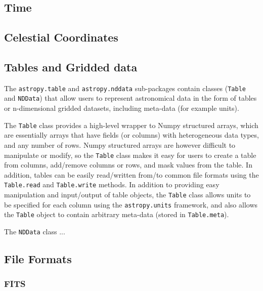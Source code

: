 \documentclass[12pt,preprint]{aastex}
\begin{document}


\subsection{Time}



\subsection{Celestial Coordinates}



\subsection{Tables and Gridded data}


The \texttt{astropy.table} and \texttt{astropy.nddata} sub-packages contain
classes (\texttt{Table} and \texttt{NDData}) that allow users to represent
astronomical data in the form of tables or n-dimensional gridded datasets,
including meta-data (for example units).

The \texttt{Table} class provides a high-level wrapper to Numpy structured
arrays, which are essentially arrays that have fields (or columns) with
heterogeneous data types, and any number of rows. Numpy structured arrays are
however difficult to manipulate or modify, so the \texttt{Table} class makes
it easy for users to create a table from columns, add/remove columns or rows,
and mask values from the table. In addition, tables can be easily read/written
from/to common file formats using the \texttt{Table.read} and
\texttt{Table.write} methods. In addition to providing easy manipulation and
input/output of table objects, the \texttt{Table} class allows units to be
specified for each column using the \texttt{astropy.units} framework, and also
allows the \texttt{Table} object to contain arbitrary meta-data (stored in
\texttt{Table.meta}).

The \texttt{NDData} class ...

\subsection{File Formats}


\subsubsection{FITS}
\end{document}
